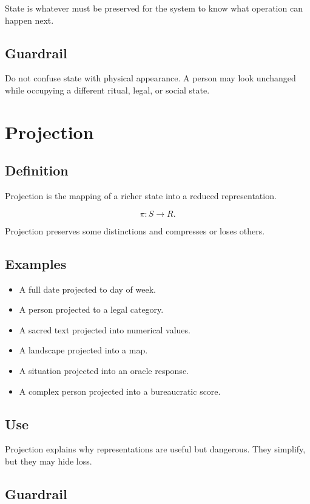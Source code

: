 \documentclass[11pt]{book}
\begin{document}
State is whatever must be preserved for the system to know what operation can happen next.

\subsection*{Guardrail}

Do not confuse state with physical appearance. A person may look unchanged while occupying a different ritual, legal, or social state.

\section{Projection}

\subsection*{Definition}

Projection is the mapping of a richer state into a reduced representation.

\[
\pi:S \rightarrow R.
\]

Projection preserves some distinctions and compresses or loses others.

\subsection*{Examples}

\begin{itemize}
    \item A full date projected to day of week.
    \item A person projected to a legal category.
    \item A sacred text projected into numerical values.
    \item A landscape projected into a map.
    \item A situation projected into an oracle response.
    \item A complex person projected into a bureaucratic score.
\end{itemize}

\subsection*{Use}

Projection explains why representations are useful but dangerous. They simplify, but they may hide loss.

\subsection*{Guardrail}
\end{document}
